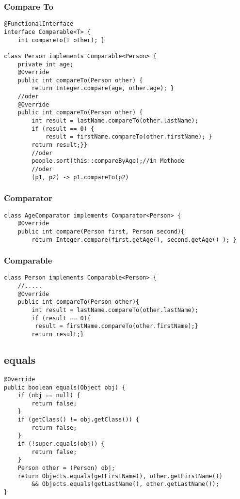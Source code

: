 \begin{multicols*}{5}
	\subsubsection{Compare To}
		\begin{lstlisting}
@FunctionalInterface
interface Comparable<T> {
	int compareTo(T other); }

class Person implements Comparable<Person> {
	private int age;
	@Override 
	public int compareTo(Person other) {
		return Integer.compare(age, other.age); }
	//oder
	@Override 
	public int compareTo(Person other) {
		int result = lastName.compareTo(other.lastName);
		if (result == 0) {
			result = firstName.compareTo(other.firstName); } 
		return result;}}
		//oder
		people.sort(this::compareByAge);//in Methode
		//oder
		(p1, p2) -> p1.compareTo(p2)
		\end{lstlisting}
	
	
	
	\subsubsection{Comparator}
		\begin{lstlisting}
class AgeComparator implements Comparator<Person> {
	@Override
	public int compare(Person first, Person second){
		return Integer.compare(first.getAge(), second.getAge() ); }
		\end{lstlisting}
	
	\subsubsection{Comparable}
		\begin{lstlisting}
class Person implements Comparable<Person> {
	//.....
	@Override
	public int compareTo(Person other){
		int result = lastName.compareTo(other.lastName);
		if (result == 0){ 
		 result = firstName.compareTo(other.firstName);}
		return result;}
		\end{lstlisting}

	\subsection{equals}
		
		\begin{lstlisting}
@Override
public boolean equals(Object obj) {
	if (obj == null) {
		return false;
	}
	if (getClass() != obj.getClass()) {
		return false;
	}
	if (!super.equals(obj)) {
		return false;
	}
	Person other = (Person) obj;
	return Objects.equals(getFirstName(), other.getFirstName()) 
		&& Objects.equals(getLastName(), other.getLastName());
}
		\end{lstlisting}
	

\end{multicols*}
